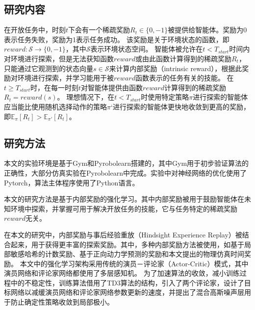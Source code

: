         \subsection{研究内容}
        在开放任务中，时刻$t$下会有一个稀疏奖励$R_t\in\{0,-1\}$被提供给智能体。奖励为0表示任务失败，奖励为1表示任务成功。
        该奖励是关于环境状态的函数，即$reward:\mathcal S\to\{0,-1\}$，其中$\mathcal S$表示环境状态空间。
        智能体被允许在$t< T_{start}$时间内对环境进行探索，但是无法获知函数$reward$或由此函数计算得到的稀疏奖励$R_t$，只能通过它观测到的状态向量$s\in\mathcal S$来计算内部奖励（intrinsic reward），根据此奖励对环境进行探索，并学习能用于被$reward$函数表示的任务有关的技能。
        在$t\geq T_{start}$时，在每一时刻$t$对智能体提供由函数$reward$计算得到的稀疏奖励$R_t=reward(s)$。
        理想情况下，在$t<T_{start}$时使用特定策略$\pi$进行探索的智能体应当能比使用随机选择动作的策略$\pi‘$进行探索的智能体更快地收敛到更高的奖励，即$\mathbb E_\pi[R_t]>\mathbb E_{\pi'}[R_t]$。

        \subsection{研究方法}
        本文的实验环境是基于Gym\cite{brockman2016openai}和Pyrobolearn\cite{delhaisse2019pyrobolearn}搭建的，其中Gym用于初步验证算法的正确性，大部分仿真实验在Pyrobolearn中完成。实验中对神经网络的优化使用了Pytorch\cite{paszke2019pytorch}，算法主体程序使用了Python语言。

        本文的研究方法是基于内部奖励的强化学习。其中内部奖励被用于鼓励智能体在未知环境中探索，并掌握可用于解决开放任务的技能，它与任务特定的稀疏奖励$reward$无关。

        在本文的研究中，内部奖励与事后经验重放（Hindsight Experience Replay）被结合起来，用于获得更丰富的探索奖励。其中，多种内部奖励方法被使用，如基于局部敏感哈希的计数奖励、基于正向动力学预测的奖励和本文提出的物理仿真时间奖励。
        本文中的强化学习架构采用传统的演员－评论家（Actor-Critic）模式\cite{konda2002actor}，其中演员网络和评论家网络都使用了多层感知机。
        为了加速算法的收敛，减小训练过程中的不稳定性，训练算法借用了TD3算法\cite{DBLP:journals/corr/abs-1802-09477}的结构，引入了两个评论家，设计了目标网络以减缓演员网络和评论家网络参数更新的速度，并提出了混合高斯噪声层用于防止确定性策略收敛到局部极小。

